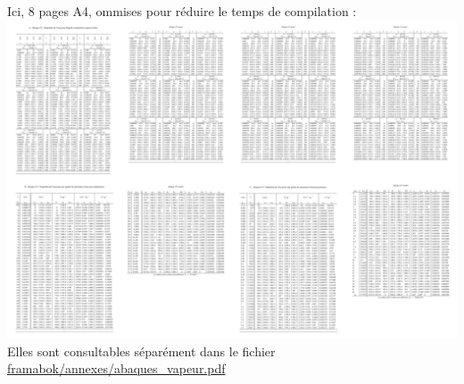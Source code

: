 
\begin{center}
	Ici, 8 pages A4, ommises pour réduire le temps de compilation :
	\includegraphics[width=\textwidth]{images/abaques.png}
	Elles sont consultables séparément dans le fichier \url{framabok/annexes/abaques_vapeur.pdf}
\end{center}
